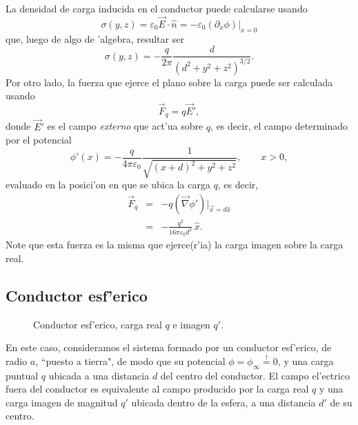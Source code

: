 La densidad de carga inducida en el conductor puede calcularse usando
\begin{equation}
 \sigma(y,z)=\varepsilon_0
\vec{E}\cdot\hat{n}=-\varepsilon_0\left.(\partial_x\phi)\right|_{x=0}
\end{equation}
que, luego de algo de 'algebra, resultar ser
\begin{equation}
 \sigma(y,z)=-\frac{q}{2\pi}\frac{d}{(d^2+y^2+z^2)^{3/2}}.
\end{equation}
Por otro lado, la fuerza que ejerce el plano sobre la carga puede ser calculada usando
\begin{equation}
\vec{F}_q=q\vec{E}',
\end{equation}
donde $\vec{E}'$ es el campo \textit{externo} que act'ua sobre $q$, es decir, el campo
determinado por el potencial
\begin{equation}
 \phi'(x)=-\frac{q}{4\pi\varepsilon_0}\frac{1}{\sqrt{(x+d)^2+y^2+z^2}},
\qquad x>0,
\end{equation}
evaluado en la posici'on en que se ubica la carga $q$, es decir,
\begin{eqnarray}
 \vec{F}_q&=&-q(\vec{\nabla}\phi')|_{\vec{x}=d\hat{x}} \\
&=&-\frac{q^2}{16\pi\varepsilon_0d^2}\,\hat{x}.
\end{eqnarray}
Note que esta fuerza es la misma que ejerce(r'ia) la carga imagen sobre la carga real.

\subsection{Conductor esf'erico}
\begin{figure}[!h]
\centerline{}
\caption{Conductor esf'erico, carga real $q$ e imagen $q'$.}
\label{ci02}
\end{figure}
En este caso, consideramos el sistema formado por un conductor esf'erico, de radio $a$, ``puesto a tierra", de modo que su potencial $\phi=\phi_\infty\stackrel{!}{=}0$, y una carga puntual $q$ ubicada a una distancia $d$ del centro del conductor. El campo el'ectrico fuera del conductor es equivalente al campo producido por la carga real $q$ y una carga imagen de magnitud $q'$ ubicada dentro de la esfera, a una distancia $d'$ de su centro. 

